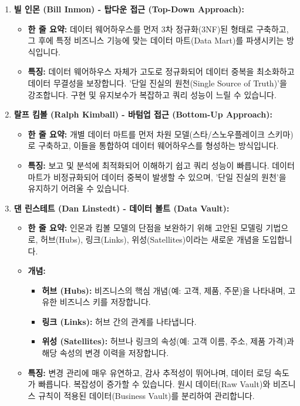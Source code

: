 \documentclass[11pt,a4paper]{article}
\begin{document}
\begin{enumerate}
    \item \textbf{빌 인몬 (Bill Inmon) - 탑다운 접근 (Top-Down Approach):}
    \begin{itemize}
        \item \textbf{한 줄 요약:} 데이터 웨어하우스를 먼저 3차 정규화(3NF)된 형태로 구축하고, 그 후에 특정 비즈니스 기능에 맞는 데이터 마트(Data Mart)를 파생시키는 방식입니다.
        \item \textbf{특징:} 데이터 웨어하우스 자체가 고도로 정규화되어 데이터 중복을 최소화하고 데이터 무결성을 보장합니다. '단일 진실의 원천(Single Source of Truth)'을 강조합니다. 구현 및 유지보수가 복잡하고 쿼리 성능이 느릴 수 있습니다.
    \end{itemize}

    \item \textbf{랄프 킴볼 (Ralph Kimball) - 바텀업 접근 (Bottom-Up Approach):}
    \begin{itemize}
        \item \textbf{한 줄 요약:} 개별 데이터 마트를 먼저 차원 모델(스타/스노우플레이크 스키마)로 구축하고, 이들을 통합하여 데이터 웨어하우스를 형성하는 방식입니다.
        \item \textbf{특징:} 보고 및 분석에 최적화되어 이해하기 쉽고 쿼리 성능이 빠릅니다. 데이터 마트가 비정규화되어 데이터 중복이 발생할 수 있으며, '단일 진실의 원천'을 유지하기 어려울 수 있습니다.
    \end{itemize}

    \item \textbf{댄 린스테트 (Dan Linstedt) - 데이터 볼트 (Data Vault):}
    \begin{itemize}
        \item \textbf{한 줄 요약:} 인몬과 킴볼 모델의 단점을 보완하기 위해 고안된 모델링 기법으로, 허브(Hubs), 링크(Links), 위성(Satellites)이라는 새로운 개념을 도입합니다.
        \item \textbf{개념:}
        \begin{itemize}
            \item \textbf{허브 (Hubs):} 비즈니스의 핵심 개념(예: 고객, 제품, 주문)을 나타내며, 고유한 비즈니스 키를 저장합니다.
            \item \textbf{링크 (Links):} 허브 간의 관계를 나타냅니다.
            \item \textbf{위성 (Satellites):} 허브나 링크의 속성(예: 고객 이름, 주소, 제품 가격)과 해당 속성의 변경 이력을 저장합니다.
        \end{itemize}
        \item \textbf{특징:} 변경 관리에 매우 유연하고, 감사 추적성이 뛰어나며, 데이터 로딩 속도가 빠릅니다. 복잡성이 증가할 수 있습니다. 원시 데이터(Raw Vault)와 비즈니스 규칙이 적용된 데이터(Business Vault)를 분리하여 관리합니다.
    \end{itemize}
\end{enumerate}
\end{document}
